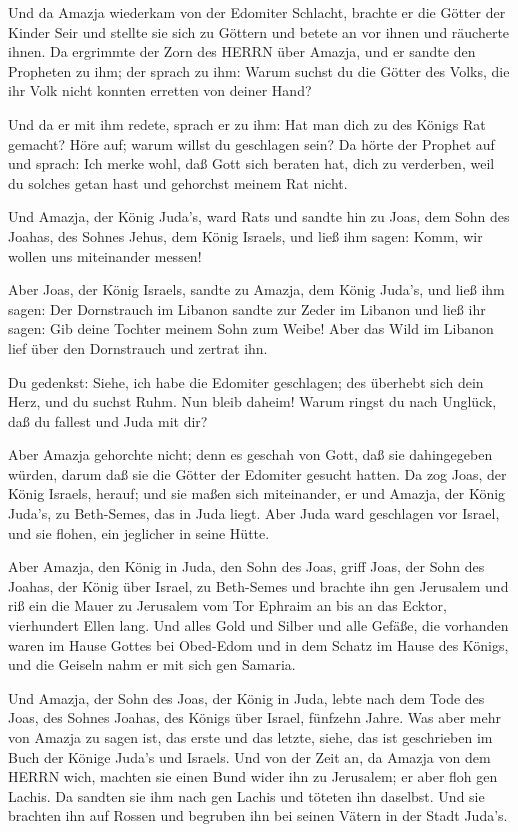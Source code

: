  Und da Amazja wiederkam von der Edomiter Schlacht, brachte
er die Götter der Kinder Seir und stellte sie sich zu Göttern und betete
an vor ihnen und räucherte ihnen.  Da ergrimmte der Zorn
des HERRN über Amazja, und er sandte den Propheten zu ihm; der sprach zu
ihm: Warum suchst du die Götter des Volks, die ihr Volk nicht konnten
erretten von deiner Hand?

 Und da er mit ihm redete, sprach er zu ihm: Hat man dich
zu des Königs Rat gemacht? Höre auf; warum willst du geschlagen sein? Da
hörte der Prophet auf und sprach: Ich merke wohl, daß Gott sich beraten
hat, dich zu verderben, weil du solches getan hast und gehorchst meinem
Rat nicht.

 Und Amazja, der König Juda's, ward Rats und sandte hin zu
Joas, dem Sohn des Joahas, des Sohnes Jehus, dem König Israels, und ließ
ihm sagen: Komm, wir wollen uns miteinander messen!

 Aber Joas, der König Israels, sandte zu Amazja, dem König
Juda's, und ließ ihm sagen: Der Dornstrauch im Libanon sandte zur Zeder
im Libanon und ließ ihr sagen: Gib deine Tochter meinem Sohn zum Weibe!
Aber das Wild im Libanon lief über den Dornstrauch und zertrat ihn.

 Du gedenkst: Siehe, ich habe die Edomiter geschlagen; des
überhebt sich dein Herz, und du suchst Ruhm. Nun bleib daheim! Warum
ringst du nach Unglück, daß du fallest und Juda mit dir?

 Aber Amazja gehorchte nicht; denn es geschah von Gott, daß
sie dahingegeben würden, darum daß sie die Götter der Edomiter gesucht
hatten.  Da zog Joas, der König Israels, herauf; und sie
maßen sich miteinander, er und Amazja, der König Juda's, zu Beth-Semes,
das in Juda liegt.  Aber Juda ward geschlagen vor Israel,
und sie flohen, ein jeglicher in seine Hütte.

 Aber Amazja, den König in Juda, den Sohn des Joas, griff
Joas, der Sohn des Joahas, der König über Israel, zu Beth-Semes und
brachte ihn gen Jerusalem und riß ein die Mauer zu Jerusalem vom Tor
Ephraim an bis an das Ecktor, vierhundert Ellen lang.  Und
alles Gold und Silber und alle Gefäße, die vorhanden waren im Hause
Gottes bei Obed-Edom und in dem Schatz im Hause des Königs, und die
Geiseln nahm er mit sich gen Samaria.

 Und Amazja, der Sohn des Joas, der König in Juda, lebte
nach dem Tode des Joas, des Sohnes Joahas, des Königs über Israel,
fünfzehn Jahre.  Was aber mehr von Amazja zu sagen ist, das
erste und das letzte, siehe, das ist geschrieben im Buch der Könige
Juda's und Israels.  Und von der Zeit an, da Amazja von dem
HERRN wich, machten sie einen Bund wider ihn zu Jerusalem; er aber floh
gen Lachis. Da sandten sie ihm nach gen Lachis und töteten ihn daselbst.
 Und sie brachten ihn auf Rossen und begruben ihn bei
seinen Vätern in der Stadt Juda's.

